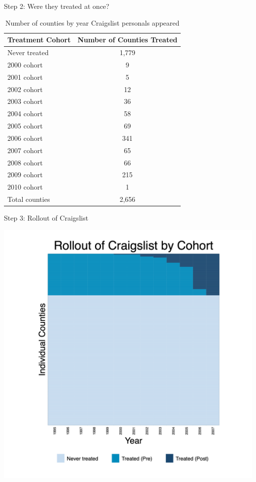 \documentclass{beamer}
\begin{document}
\begin{frame}{Step 2: Were they treated at once?}

\begin{table}[htbp]\centering
\footnotesize
\caption{Number of counties by year Craigslist personals appeared}\label{tab:countybycohort}
\begin{tabular}{lc}
\toprule
\textbf{Treatment Cohort} & \textbf{Number of Counties Treated} \\
\midrule
Never treated&       1,779\\
2000 cohort &           9\\
2001 cohort &           5\\
2002 cohort &          12\\
2003 cohort &          36\\
2004 cohort &          58\\
2005 cohort &          69\\
2006 cohort &         341\\
2007 cohort &          65\\
2008 cohort &          66\\
2009 cohort &         215\\
2010 cohort &           1\\
\midrule
Total counties &     2,656 \\
\bottomrule
\end{tabular}
\end{table}


\end{frame}

\begin{frame}{Step 3: Rollout of Craigslist}
    \begin{center}
        \includegraphics[width=0.75\linewidth,keepaspectratio]{./lecture_includes/rollout.png}
    \end{center}
\end{frame}
\end{document}
